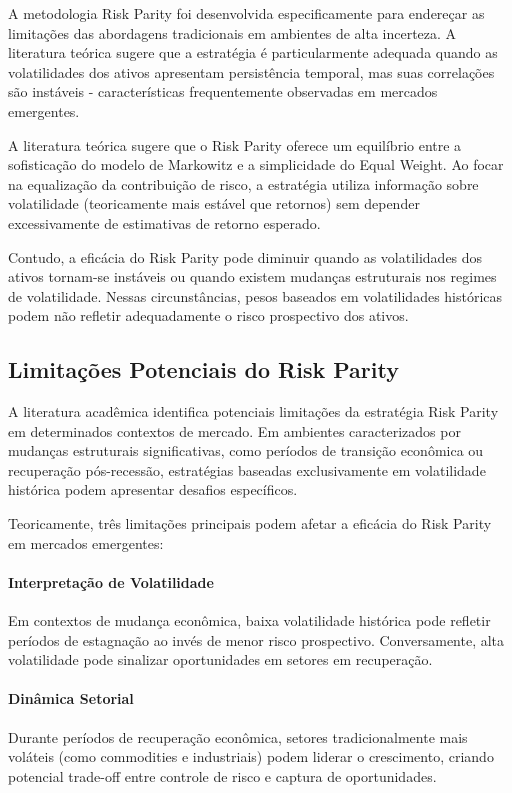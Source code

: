 A metodologia Risk Parity foi desenvolvida especificamente para endereçar as limitações das abordagens tradicionais em ambientes de alta incerteza. A literatura teórica sugere que a estratégia é particularmente adequada quando as volatilidades dos ativos apresentam persistência temporal, mas suas correlações são instáveis - características frequentemente observadas em mercados emergentes.

A literatura teórica sugere que o Risk Parity oferece um equilíbrio entre a sofisticação do modelo de Markowitz e a simplicidade do Equal Weight. Ao focar na equalização da contribuição de risco, a estratégia utiliza informação sobre volatilidade (teoricamente mais estável que retornos) sem depender excessivamente de estimativas de retorno esperado.

Contudo, a eficácia do Risk Parity pode diminuir quando as volatilidades dos ativos tornam-se instáveis ou quando existem mudanças estruturais nos regimes de volatilidade. Nessas circunstâncias, pesos baseados em volatilidades históricas podem não refletir adequadamente o risco prospectivo dos ativos.

\subsection{Limitações Potenciais do Risk Parity}

A literatura acadêmica identifica potenciais limitações da estratégia Risk Parity em determinados contextos de mercado. Em ambientes caracterizados por mudanças estruturais significativas, como períodos de transição econômica ou recuperação pós-recessão, estratégias baseadas exclusivamente em volatilidade histórica podem apresentar desafios específicos.

Teoricamente, três limitações principais podem afetar a eficácia do Risk Parity em mercados emergentes:

\paragraph{Interpretação de Volatilidade}
Em contextos de mudança econômica, baixa volatilidade histórica pode refletir períodos de estagnação ao invés de menor risco prospectivo. Conversamente, alta volatilidade pode sinalizar oportunidades em setores em recuperação.

\paragraph{Dinâmica Setorial}  
Durante períodos de recuperação econômica, setores tradicionalmente mais voláteis (como commodities e industriais) podem liderar o crescimento, criando potencial trade-off entre controle de risco e captura de oportunidades.

